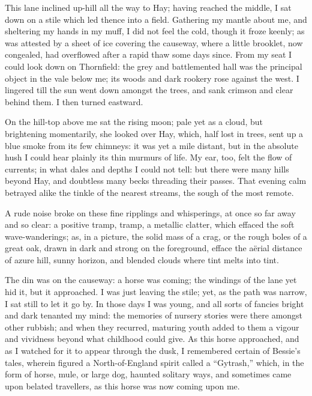 This lane inclined up-hill all the way to Hay; having reached the
middle, I sat down on a stile which led thence into a field. Gathering
my mantle about me, and sheltering my hands in my muff, I did not feel
the cold, though it froze keenly; as was attested by a sheet of ice
covering the causeway, where a little brooklet, now congealed, had
overflowed after a rapid thaw some days since. From my seat I could
look down on Thornfield: the grey and battlemented hall was the
principal object in the vale below me; its woods and dark rookery rose
against the west. I lingered till the sun went down amongst the trees,
and sank crimson and clear behind them. I then turned eastward.

On the hill-top above me sat the rising moon; pale yet as a cloud, but
brightening momentarily, she looked over Hay, which, half lost in trees,
sent up a blue smoke from its few chimneys: it was yet a mile distant,
but in the absolute hush I could hear plainly its thin murmurs of life. 
My ear, too, felt the flow of currents; in what dales and depths I could
not tell: but there were many hills beyond Hay, and doubtless many becks
threading their passes. That evening calm betrayed alike the tinkle of
the nearest streams, the sough of the most remote.

A rude noise broke on these fine ripplings and whisperings, at once so
far away and so clear: a positive tramp, tramp, a metallic clatter,
which effaced the soft wave-wanderings; as, in a picture, the solid mass
of a crag, or the rough boles of a great oak, drawn in dark and strong
on the foreground, efface the aërial distance of azure hill, sunny
horizon, and blended clouds where tint melts into tint.

The din was on the causeway: a horse was coming; the windings of the
lane yet hid it, but it approached. I was just leaving the stile; yet,
as the path was narrow, I sat still to let it go by. In those days I
was young, and all sorts of fancies bright and dark tenanted my mind:
the memories of nursery stories were there amongst other rubbish; and
when they recurred, maturing youth added to them a vigour and vividness
beyond what childhood could give. As this horse approached, and as I
watched for it to appear through the dusk, I remembered certain of
Bessie's tales, wherein figured a North-of-England spirit called a
\enquote{Gytrash,} which, in the form of horse, mule, or large dog,
haunted solitary ways, and sometimes came upon belated travellers, as
this horse was now coming upon me.


